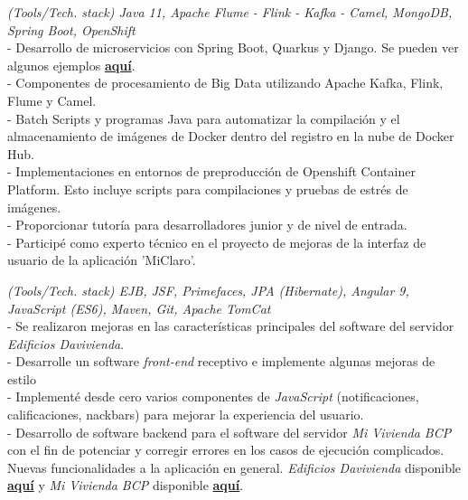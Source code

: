 \documentclass[]{CV-JuanCamiloFlorez}
\begin{document}
\begin{minipage}[t]{0.66\textwidth}
    \noindent
    \textit{(Tools/Tech. stack) Java 11, Apache Flume - Flink - Kafka - Camel, MongoDB, Spring Boot, OpenShift} \\
        - Desarrollo de microservicios con Spring Boot, Quarkus y Django. Se pueden ver algunos ejemplos \textbf{\href{https://github.com/VanJFlorez/flink-kafka-fraud-detection}{aquí}}. \\
        - Componentes de procesamiento de Big Data utilizando Apache Kafka, Flink, Flume y Camel. \\
        - Batch Scripts y programas Java para automatizar la compilación y el almacenamiento de imágenes de Docker dentro del registro en la nube de Docker Hub. \\
        - Implementaciones en entornos de preproducción de Openshift Container Platform. Esto incluye scripts para compilaciones y pruebas de estrés de imágenes. \\
        - Proporcionar tutoría para desarrolladores junior y de nivel de entrada. \\
        - Participé como experto técnico en el proyecto de mejoras de la interfaz de usuario de la aplicación 'MiClaro'. \\
        \sectionsep

    \noindent
    \textit{(Tools/Tech. stack) EJB, JSF, Primefaces, JPA (Hibernate), Angular 9, JavaScript (ES6), Maven, Git, Apache TomCat} \\
        - Se realizaron mejoras en las características principales del software del servidor \textit{Edificios Davivienda}. \\
        - Desarrolle un software \textit{front-end} receptivo e implemente algunas mejoras de estilo \\
        - Implementé desde cero varios componentes de \textit{JavaScript} (notificaciones, calificaciones, nackbars) para mejorar la experiencia del usuario. \\
        - Desarrollo de software backend para el software del servidor \textit{Mi Vivienda BCP} con el fin de potenciar y corregir errores en los casos de ejecución complicados. Nuevas funcionalidades a la aplicación en general. \textit{Edificios Davivienda} disponible \textbf{\href{https://www.edificiosdavivienda.com}{aquí}} y \textit{Mi Vivienda BCP} disponible \textbf{\href{https://www.miviviendabcp.com.bo}{aquí}}. \\
        \sectionsep


\end{minipage}
\end{document}
